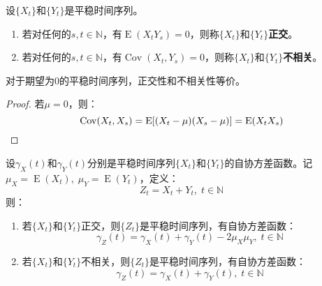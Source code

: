\begin{definition}
	设$\{X_t\}$和$\{Y_t\}$是平稳时间序列。
	\begin{enumerate}
		\item 若对任何的$s,t\in\mathbb{N}$，有$\operatorname{E}(X_tY_s)=0$，则称$\{X_t\}$和$\{Y_t\}$\textbf{正交}。
		\item 若对任何的$s,t\in\mathbb{N}$，有$\operatorname{Cov}(X_t,Y_s)=0$，则称$\{X_t\}$和$\{Y_t\}$\textbf{不相关}。
	\end{enumerate}
\end{definition}
\begin{theorem}
	对于期望为$0$的平稳时间序列，正交性和不相关性等价。
\end{theorem}
\begin{proof}
	若$\mu=0$，则：
	\begin{equation*}
		\operatorname{Cov}(X_t,X_s)=\operatorname{E}[(X_t-\mu)(X_s-\mu)]=\operatorname{E}(X_tX_s)\qedhere
	\end{equation*}
\end{proof}
\begin{theorem}
	设$\gamma_X(t)$和$\gamma_Y(t)$分别是平稳时间序列$\{X_t\}$和$\{Y_t\}$的自协方差函数。记$\mu_X=\operatorname{E}(X_t),\;\mu_Y=\operatorname{E}(Y_t)$，定义：
	\begin{equation*}
		Z_t=X_t+Y_t,\;t\in\mathbb{N}
	\end{equation*}
	则：
	\begin{enumerate}
		\item 若$\{X_t\}$和$\{Y_t\}$正交，则$\{Z_t\}$是平稳时间序列，有自协方差函数：
		\begin{equation*}
			\gamma_Z(t)=\gamma_X(t)+\gamma_Y(t)-2\mu_X\mu_Y,\;t\in\mathbb{N}
		\end{equation*}
		\item 若$\{X_t\}$和$\{Y_t\}$不相关，则$\{Z_t\}$是平稳时间序列，有自协方差函数：
		\begin{equation*}
			\gamma_Z(t)=\gamma_X(t)+\gamma_Y(t),\;t\in\mathbb{N}
		\end{equation*}
	\end{enumerate}
\end{theorem}
